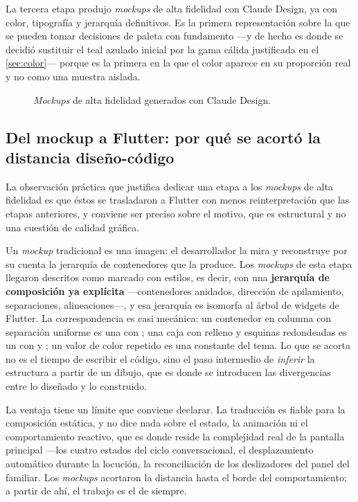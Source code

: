 La tercera etapa produjo \emph{mockups} de alta fidelidad con Claude Design, ya con color, tipografía y
jerarquía definitivos. Es la primera representación sobre la que se pueden tomar decisiones de paleta con
fundamento ---y de hecho es donde se decidió sustituir el teal azulado inicial por la gama cálida
justificada en el \autoref{sec:color}--- porque es la primera en la que el color aparece en su proporción
real y no como una muestra aislada.

\begin{figure}[htbp]\centering
  \caption{\emph{Mockups} de alta fidelidad generados con Claude Design.}
  \label{fig:mockups}
\end{figure}

\subsection{Del mockup a Flutter: por qué se acortó la distancia diseño-código}

La observación práctica que justifica dedicar una etapa a los \emph{mockups} de alta fidelidad es que
éstos se trasladaron a Flutter con menos reinterpretación que las etapas anteriores, y conviene ser
preciso sobre el motivo, que es estructural y no una cuestión de calidad gráfica.

Un \emph{mockup} tradicional es una imagen: el desarrollador la mira y reconstruye por su cuenta la
jerarquía de contenedores que la produce. Los \emph{mockups} de esta etapa llegaron descritos como
marcado con estilos, es decir, con una \textbf{jerarquía de composición ya explícita} ---contenedores
anidados, dirección de apilamiento, separaciones, alineaciones---, y esa jerarquía es isomorfa al árbol de
widgets de Flutter. La correspondencia es casi mecánica: un contenedor en columna con separación uniforme
es una  con ; una caja con relleno y esquinas redondeadas es un 
con  y ; un valor de color repetido es una constante del tema. Lo que se
acorta no es el tiempo de escribir el código, sino el paso intermedio de \emph{inferir} la estructura a
partir de un dibujo, que es donde se introducen las divergencias entre lo diseñado y lo construido.

La ventaja tiene un límite que conviene declarar. La traducción es fiable para la composición estática, y
no dice nada sobre el estado, la animación ni el comportamiento reactivo, que es donde reside la
complejidad real de la pantalla principal ---los cuatro estados del ciclo conversacional, el
desplazamiento automático durante la locución, la reconciliación de los deslizadores del panel del
familiar. Los \emph{mockups} acortaron la distancia hasta el borde del comportamiento; a partir de ahí, el
trabajo es el de siempre.

